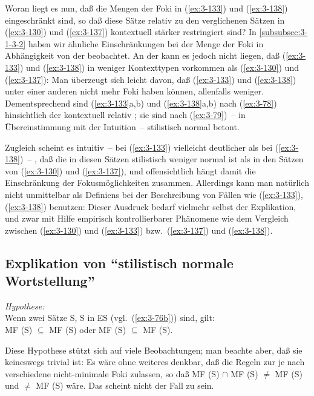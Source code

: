 \documentclass[output=paper]{langsci/langscibook}
\begin{document}
Woran liegt es nun, daß die Mengen der Foki in (\ref{ex:3-133}) und (\ref{ex:3-138}) eingeschränkt sind, so daß diese Sätze relativ zu den verglichenen Sätzen in (\ref{ex:3-130}) und (\ref{ex:3-137}) kontextuell stärker restringiert sind? In \ref{subsubsec:3-1-3-2} haben wir ähnliche Einschränkungen bei der Menge der Foki in Abhängigkeit von der  beobachtet. An der  kann es jedoch nicht liegen, daß (\ref{ex:3-133}) und (\ref{ex:3-138}) in weniger Kontexttypen vorkommen als (\ref{ex:3-130}) und (\ref{ex:3-137}): Man überzeugt sich leicht davon, daß (\ref{ex:3-133}) und (\ref{ex:3-138}) unter einer anderen  nicht mehr Foki haben können, allenfalls weniger. Dementsprechend sind (\ref{ex:3-133}a,b) und (\ref{ex:3-138}a,b) nach (\ref{ex:3-78}) hinsichtlich der  kontextuell relativ ; sie sind nach (\ref{ex:3-79})~-- in Übereinstimmung mit der Intuition~-- stilistisch normal betont.

Zugleich scheint es intuitiv~-- bei (\ref{ex:3-133}) vielleicht deutlicher als
bei (\ref{ex:3-138})~-- , daß die  in diesen Sätzen stilistisch
weniger normal ist als in den Sätzen von (\ref{ex:3-130}) und (\ref{ex:3-137}), und
offensichtlich hängt damit die Einschränkung der Fokusmöglichkeiten
zusammen. Allerdings kann man  natürlich nicht unmittelbar als Definiens bei der Beschreibung von Fällen wie (\ref{ex:3-133}), (\ref{ex:3-138}) benutzen: Dieser Ausdruck bedarf vielmehr selbst der Explikation, und zwar mit Hilfe empirisch
kontrollierbarer Phänomene wie dem Vergleich zwischen (\ref{ex:3-130}) und (\ref{ex:3-133})
bzw.\ (\ref{ex:3-137}) und (\ref{ex:3-138}).

\subsection{Explikation von "`stilistisch normale Wortstellung"'}
\label{subsec:3-2-2}
\begin{exe}
\ex
\label{ex:3-143}
\textit{Hypothese:} \\
Wenn zwei Sätze S, S in ES (vgl.\ (\ref{ex:3-76b})) sind, gilt:\\ MF (S) $\subseteq$ MF (S) oder MF (S) $\subseteq$ MF (S).
\end{exe}
Diese Hypothese stützt sich auf viele Beobachtungen; man beachte aber,
daß sie keineswegs trivial ist: Es wäre ohne weiteres denkbar, daß die
Regeln zur  je nach  verschiedene
nicht-minimale Foki zulassen, so daß MF (S) $\cap$ MF (S)
$\neq$ MF (S) und $\neq$ MF (S) wäre. Das scheint nicht der
Fall zu sein.
\end{document}
